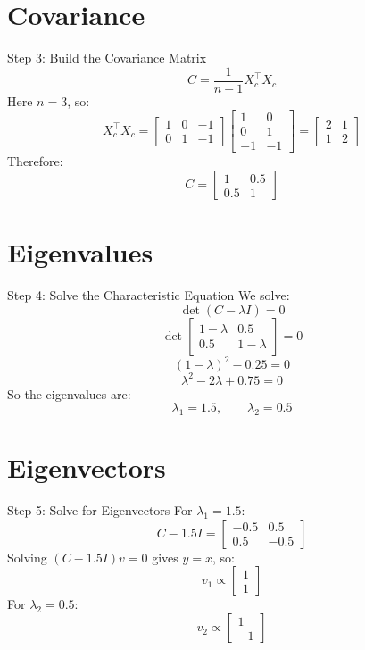 \documentclass[aspectratio=169]{beamer}
\begin{document}
\section{Covariance}

\begin{frame}{Step 3: Build the Covariance Matrix}
  \[
    C = \frac{1}{n-1} X_c^\top X_c
  \]
  Here $n=3$, so:
  \[
    X_c^\top X_c =
    \begin{bmatrix}
      1 & 0 & -1\\
      0 & 1 & -1
    \end{bmatrix}
    \begin{bmatrix}
      1 & 0\\
      0 & 1\\
      -1 & -1
    \end{bmatrix}
    =
    \begin{bmatrix}
      2 & 1\\
      1 & 2
    \end{bmatrix}
  \]
  Therefore:
  \[
    C =
    \begin{bmatrix}
      1 & 0.5\\
      0.5 & 1
    \end{bmatrix}
  \]
\end{frame}

\section{Eigenvalues}

\begin{frame}{Step 4: Solve the Characteristic Equation}
  We solve:
  \[
    \det(C - \lambda I)=0
  \]
  \[
    \det
    \begin{bmatrix}
      1-\lambda & 0.5\\
      0.5 & 1-\lambda
    \end{bmatrix}
    = 0
  \]
  \[
    (1-\lambda)^2 - 0.25 = 0
  \]
  \[
    \lambda^2 - 2\lambda + 0.75 = 0
  \]
  So the eigenvalues are:
  \[
    \lambda_1 = 1.5,
    \qquad
    \lambda_2 = 0.5
  \]
\end{frame}

\section{Eigenvectors}

\begin{frame}{Step 5: Solve for Eigenvectors}
  For $\lambda_1 = 1.5$:
  \[
    C - 1.5I =
    \begin{bmatrix}
      -0.5 & 0.5\\
      0.5 & -0.5
    \end{bmatrix}
  \]
  Solving $(C-1.5I)v=0$ gives $y=x$, so:
  \[
    v_1 \propto
    \begin{bmatrix}
      1\\1
    \end{bmatrix}
  \]
  For $\lambda_2 = 0.5$:
  \[
    v_2 \propto
    \begin{bmatrix}
      1\\-1
    \end{bmatrix}
  \]
\end{frame}
\end{document}
